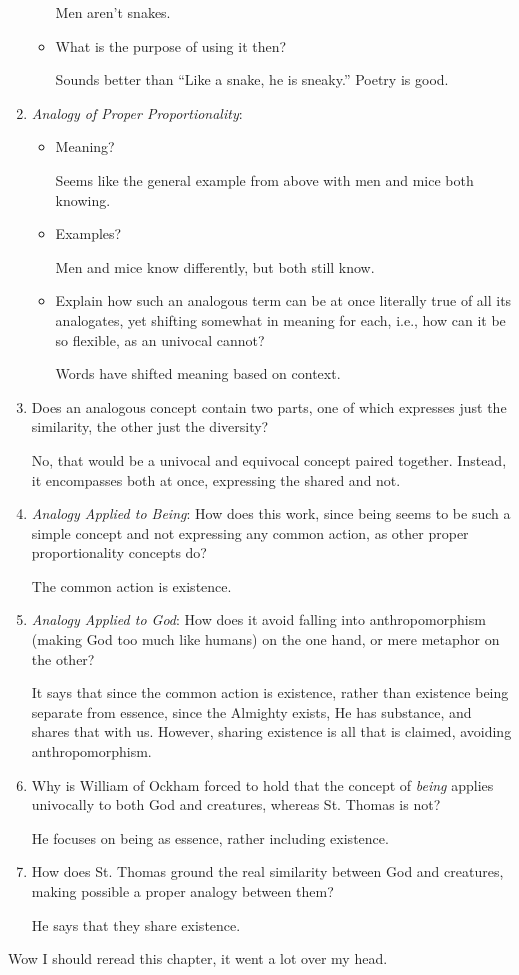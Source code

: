 \documentclass[12pt]{article}[titlepage]
\newcommand{\say}[1]{``#1''}
\newcommand{\1}{\={a}}
\newcommand{\2}{\={e}}
\newcommand{\3}{\={\i}}
\newcommand{\4}{\=o}
\newcommand{\5}{\=u}
\newcommand{\6}{\={A}}
\renewcommand{\,}{\textsuperscript{,}}
\begin{document}
\begin{enumerate}
\begin{itemize}
Men aren't snakes.
\item What is the purpose of using it then?

Sounds better than \say{Like a snake, he is sneaky.}
Poetry is good.
\end{itemize}
\item \emph{Analogy of Proper Proportionality}:
\begin{itemize}
\item Meaning?

Seems like the general example from above with men and mice both knowing.
\item Examples?

Men and mice know differently, but both still know.
\item Explain how such an analogous term can be at once literally true of all its analogates, yet shifting somewhat in meaning for each, i.e., how can it be so flexible, as an univocal cannot?

Words have shifted meaning based on context.
\end{itemize}
\item Does an analogous concept contain two parts, one of which expresses just the similarity, the other just the diversity?

No, that would be a univocal and equivocal concept paired together.
Instead, it encompasses both at once, expressing the shared and not.
\item \emph{Analogy Applied to Being}: How does this work, since being seems to be such a simple concept and not expressing any common action, as other proper proportionality concepts do?

The common action is existence.
\item \emph{Analogy Applied to God}: How does it avoid falling into anthropomorphism (making God too much like humans) on the one hand, or mere metaphor on the other?

It says that since the common action is existence, rather than existence being separate from essence, since the Almighty exists, He has substance, and shares that with us.
However, sharing existence is all that is claimed, avoiding anthropomorphism.
\item Why is William of Ockham forced to hold that the concept of \emph{being} applies univocally to both God and creatures, whereas St. Thomas is not?

He focuses on being as essence, rather including existence.
\item How does St. Thomas ground the real similarity between God and creatures, making possible a proper analogy between them?

He says that they share existence.
\end{enumerate}

Wow I should reread this chapter, it went a lot over my head.
\end{document}
